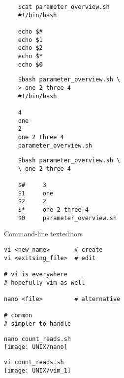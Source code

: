 \documentclass[xcolor=dvipsnames]{beamer}
\begin{document}
\begin{frame}[fragile]
\LARGE
\begin{verbatim}
	$cat parameter_overview.sh
	#!/bin/bash

	echo $#
	echo $1
	echo $2
	echo $*
	echo $0
\end{verbatim}
\end{frame}

\begin{frame}[fragile]
\LARGE
\begin{verbatim}
	$bash parameter_overview.sh \
	> one 2 three 4
	#!/bin/bash

	4
	one
	2
	one 2 three 4
	parameter_overview.sh
\end{verbatim}
\end{frame}

\begin{frame}[fragile]
\LARGE
\begin{verbatim}
	$bash parameter_overview.sh \
	\ one 2 three 4

	$#     3
	$1     one
	$2     2
	$*     one 2 three 4
	$0     parameter_overview.sh
\end{verbatim}
\end{frame}

\begin{frame}[fragile]
	\begin{center}
		\Huge
		Command-line texteditors
	\end{center}
	\Large
\begin{verbatim}
vi <new_name>       # create
vi <exitsing_file>  # edit

# vi is everywhere
# hopefully vim as well

nano <file>         # alternative

# common
# simpler to handle
\end{verbatim}
\end{frame}

\begin{frame}[fragile]
	\begin{center}
		\Large
		\verb!nano count_reads.sh! \\
		\vspace{1cm}
		\texttt{[image: UNIX/nano]}
	\end{center}
\end{frame}

\begin{frame}[fragile]
	\begin{center}
		\Large
		\verb!vi count_reads.sh! \\
		\vspace{1cm}
		\texttt{[image: UNIX/vim\_1]}
	\end{center}
\end{frame}
\end{document}

